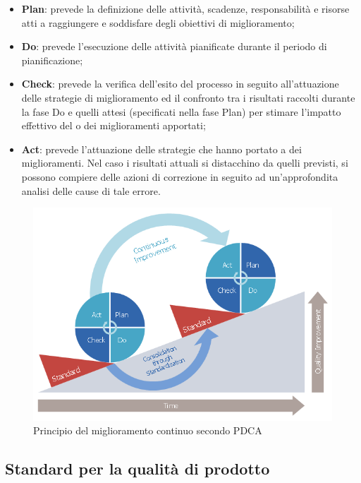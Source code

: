\documentclass[11pt,a4paper]{article}
\begin{document}
{\begin{itemize}
	\item \textbf{Plan}: prevede la definizione delle attività, scadenze, responsabilità e risorse atti a raggiungere e soddisfare degli obiettivi di miglioramento;
	\item \textbf{Do}: prevede l'esecuzione delle attività pianificate durante il periodo di pianificazione;
	\item \textbf{Check}: prevede la verifica dell'esito del processo in seguito all'attuazione delle strategie di miglioramento ed il confronto tra i risultati raccolti durante la fase Do e quelli attesi (specificati nella fase Plan) per stimare l'impatto effettivo del o dei miglioramenti apportati;
	\item \textbf{Act}: prevede l'attuazione delle strategie che hanno portato a dei miglioramenti. Nel caso i risultati attuali si distacchino da quelli previsti, si possono compiere delle azioni di correzione in seguito ad un'approfondita analisi delle cause di tale errore. 
\end{itemize}
\begin{figure}[H]
	\centering
	\includegraphics[scale=0.5]{images/pdca.png}
	\caption{Principio del miglioramento continuo secondo PDCA}
	
\end{figure}
\subsection{Standard per la qualità di prodotto}

}
\end{document}
